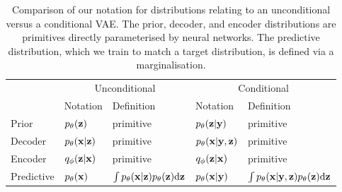 \begin{table}[t]
\centering
\begin{tabular}{l|ll|ll}
 & \multicolumn{2}{c|}{Unconditional} & \multicolumn{2}{c}{Conditional} \\ 
\cline{2-5}
& Notation & Definition & Notation & Definition \\ 
\hline
Prior & \( p_\theta({\mathbf{z}}) \) & primitive  & \( p_\theta({\mathbf{z}}|{\mathbf{y}}) \) & primitive  \\
Decoder & \( p_\theta({\mathbf{x}}|{\mathbf{z}}) \) & primitive  & \( p_\theta({\mathbf{x}}|{\mathbf{y}},{\mathbf{z}}) \) & primitive \\
Encoder & \( q_\phi({\mathbf{z}}|{\mathbf{x}}) \) & primitive  & \( q_\phi({\mathbf{z}}|{\mathbf{x}}) \) & primitive \\
Predictive & \( p_\theta({\mathbf{x}}) \) & \( \int p_\theta({\mathbf{x}}|{\mathbf{z}})p_\theta({\mathbf{z}}) \mathrm{d}{\mathbf{z}} \)  & \( p_\theta({\mathbf{x}}|{\mathbf{y}}) \) & \( \int p_\theta({\mathbf{x}}|{\mathbf{y}},{\mathbf{z}})p_\theta({\mathbf{z}}) \mathrm{d}{\mathbf{z}} \) \\
\end{tabular}
\caption{Comparison of our notation for distributions relating to an unconditional versus a conditional VAE. The prior, decoder, and encoder distributions are primitives directly parameterised by neural networks. The predictive distribution, which we train to match a target distribution, is defined via a marginalisation.}
\label{tab:vae_components}
\end{table}



